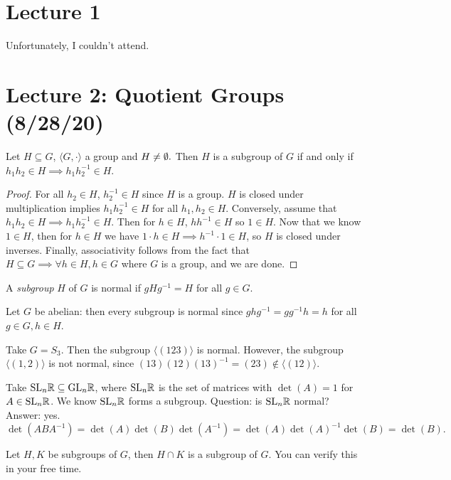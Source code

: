 \section{Lecture 1}
Unfortunately, I couldn't attend.
\section{Lecture 2: Quotient Groups (8/28/20)}
\begin{lemma} Let $H \subseteq G$, $\langle G, \cdot \rangle$ a group and $H \neq \emptyset.$ Then $H$ is a subgroup of $G$ if and only if $h_1h_2 \in H \implies h_1h_2^{-1}\in H$.
\end{lemma}
\begin{proof}
    For all $h_2 \in H$, $h_2^{-1} \in H$ since $H$ is a group. $H$ is closed under multiplication implies $h_1h_2^{-1}\in H$ for all $h_1,h_2 \in H$. Conversely, assume that $h_1h_2\in H\implies h_1h_2^{-1}\in H.$ Then for $h\in H$, $hh^{-1}\in H$ so $1\in H$. Now that we know $1\in H$, then for $h\in H$ we have $1\cdot h \in H \implies h^{-1}\cdot 1\in H$, so $H$ is closed under inverses. Finally, associativity follows from the fact that  $H \subseteq G \implies \forall h \in H, h \in G$ where $G$ is a group, and we are done.
\end{proof}

\begin{definition}
    A \emph{subgroup} $H$ of $G$ is normal if $gHg^{-1}=H$ for all $g \in G$.
\end{definition}
\begin{example}
    Let $G$ be abelian: then every subgroup is normal since $ghg^{-1}=gg^{-1}h=h$ for all $g \in G, h \in H$.
\end{example}
\begin{example}
    Take $G=S_3.$ Then the subgroup $\langle (123) \rangle$ is normal. However, the subgroup $\langle (1,2) \rangle$ is not normal, since $(13)(12)(13)^{-1}=(23) \notin \langle(12)\rangle$.
\end{example}
\begin{example}
    Take $\textrm{SL}_n\mathbb{R} \subseteq \textrm{GL}_n\mathbb{R}$, where $\textrm{SL}_n\mathbb{R}$ is the set of matrices with $\det(A)=1$ for $A \in \textrm{SL}_n\mathbb{R}$. We know $\textrm{SL}_n\mathbb{R}$ forms a subgroup. Question: is $\textrm{SL}_n\mathbb{R}$ normal? Answer: yes.
    \[
        \det(ABA^{-1})=\det(A)\det(B)\det(A^{-1})=\det(A)\det(A)^{-1}\det(B)=\det(B).
    \]
\end{example}

\begin{prop}
    Let $H, K$ be subgroups of $G$, then $H \cap K$ is a subgroup of $G.$ You can verify this in your free time.
\end{prop}

